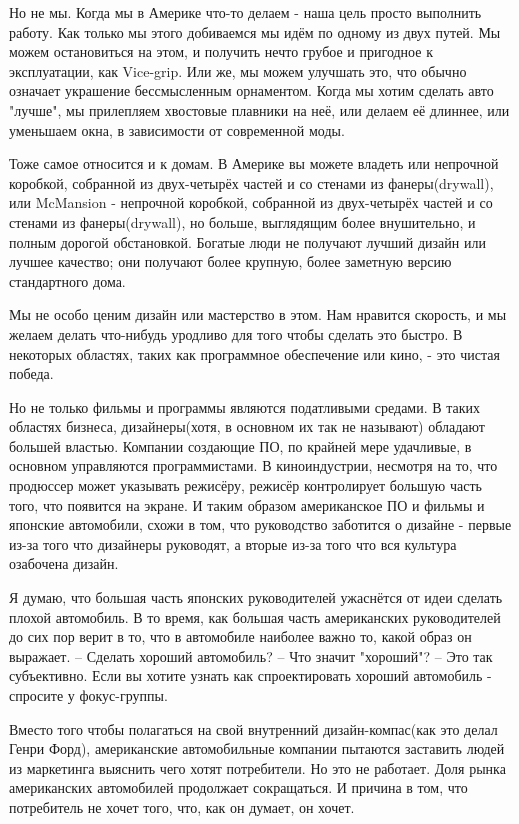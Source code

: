 \documentclass[ebook,12pt,oneside,openany]{memoir}
\begin{document}
Но не мы. Когда мы в Америке что-то делаем - наша цель просто
выполнить работу. Как только мы этого добиваемся мы идём по одному из
двух путей. Мы можем остановиться на этом, и получить нечто грубое и
пригодное к эксплуатации, как Vice-grip. Или же, мы можем улучшать
это, что обычно означает украшение бессмысленным орнаментом. Когда мы
хотим сделать авто "лучше", мы прилепляем хвостовые плавники на неё,
или делаем её длиннее, или уменьшаем окна, в зависимости от
современной моды.

Тоже самое относится и к домам. В Америке вы можете владеть или
непрочной коробкой, собранной из двух-четырёх частей и со стенами из
фанеры(drywall), или McMansion - непрочной коробкой, собранной из
двух-четырёх частей и со стенами из фанеры(drywall), но больше,
выглядящим более внушительно, и полным дорогой обстановкой. Богатые
люди не получают лучший дизайн или лучшее качество; они получают более
крупную, более заметную версию стандартного дома.

Мы не особо ценим дизайн или мастерство в этом. Нам нравится скорость,
и мы желаем делать что-нибудь уродливо для того чтобы сделать это
быстро. В некоторых областях, таких как программное обеспечение или
кино, - это чистая победа.

Но не только фильмы и программы являются податливыми средами. В таких
областях бизнеса, дизайнеры(хотя, в основном их так не называют)
обладают большей властью. Компании создающие ПО, по крайней мере
удачливые, в основном управляются программистами. В киноиндустрии,
несмотря на то, что продюссер может указывать режисёру, режисёр
контролирует большую часть того, что появится на экране. И таким
образом американское ПО и фильмы и японские автомобили, схожи в том,
что руководство заботится о дизайне - первые из-за того что дизайнеры
руководят, а вторые из-за того что вся культура озабочена дизайн.

Я думаю, что большая часть японских руководителей ужаснётся от идеи
сделать плохой автомобиль. В то время, как большая часть американских
руководителей до сих пор верит в то, что в автомобиле наиболее важно
то, какой образ он выражает. -- Сделать хороший автомобиль? -- Что
значит "хороший"? -- Это так субъективно. Если вы хотите узнать как
спроектировать хороший автомобиль - спросите у фокус-группы.

Вместо того чтобы полагаться на свой внутренний дизайн-компас(как это
делал Генри Форд), американские автомобильные компании пытаются
заставить людей из маркетинга выяснить чего хотят потребители. Но это
не работает. Доля рынка американских автомобилей продолжает
сокращаться. И причина в том, что потребитель не хочет того, что, как
он думает, он хочет.
\end{document}
